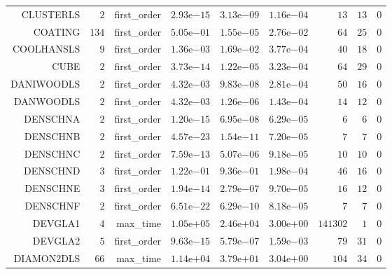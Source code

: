 \begin{longtable}{rrrrrrrrr}
CLUSTERLS & \(     2\) & first\_order & \( 2.93\)e\(-15\) & \( 3.13\)e\(-09\) & \( 1.16\)e\(-04\) & \(    13\) & \(    13\) & \(     0\) \\
COATING & \(   134\) & first\_order & \( 5.05\)e\(-01\) & \( 1.55\)e\(-05\) & \( 2.76\)e\(-02\) & \(    64\) & \(    25\) & \(     0\) \\
COOLHANSLS & \(     9\) & first\_order & \( 1.36\)e\(-03\) & \( 1.69\)e\(-02\) & \( 3.77\)e\(-04\) & \(    40\) & \(    18\) & \(     0\) \\
CUBE & \(     2\) & first\_order & \( 3.73\)e\(-14\) & \( 1.22\)e\(-05\) & \( 3.23\)e\(-04\) & \(    64\) & \(    29\) & \(     0\) \\
DANIWOODLS & \(     2\) & first\_order & \( 4.32\)e\(-03\) & \( 9.83\)e\(-08\) & \( 2.81\)e\(-04\) & \(    50\) & \(    16\) & \(     0\) \\
DANWOODLS & \(     2\) & first\_order & \( 4.32\)e\(-03\) & \( 1.26\)e\(-06\) & \( 1.43\)e\(-04\) & \(    14\) & \(    12\) & \(     0\) \\
DENSCHNA & \(     2\) & first\_order & \( 1.20\)e\(-15\) & \( 6.95\)e\(-08\) & \( 6.29\)e\(-05\) & \(     6\) & \(     6\) & \(     0\) \\
DENSCHNB & \(     2\) & first\_order & \( 4.57\)e\(-23\) & \( 1.54\)e\(-11\) & \( 7.20\)e\(-05\) & \(     7\) & \(     7\) & \(     0\) \\
DENSCHNC & \(     2\) & first\_order & \( 7.59\)e\(-13\) & \( 5.07\)e\(-06\) & \( 9.18\)e\(-05\) & \(    10\) & \(    10\) & \(     0\) \\
DENSCHND & \(     3\) & first\_order & \( 1.22\)e\(-01\) & \( 9.36\)e\(-01\) & \( 1.98\)e\(-04\) & \(    46\) & \(    16\) & \(     0\) \\
DENSCHNE & \(     3\) & first\_order & \( 1.94\)e\(-14\) & \( 2.79\)e\(-07\) & \( 9.70\)e\(-05\) & \(    16\) & \(    12\) & \(     0\) \\
DENSCHNF & \(     2\) & first\_order & \( 6.51\)e\(-22\) & \( 6.29\)e\(-10\) & \( 8.18\)e\(-05\) & \(     7\) & \(     7\) & \(     0\) \\
DEVGLA1 & \(     4\) & max\_time & \( 1.05\)e\(+05\) & \( 2.46\)e\(+04\) & \( 3.00\)e\(+00\) & \(141302\) & \(     1\) & \(     0\) \\
DEVGLA2 & \(     5\) & first\_order & \( 9.63\)e\(-15\) & \( 5.79\)e\(-07\) & \( 1.59\)e\(-03\) & \(    79\) & \(    31\) & \(     0\) \\
DIAMON2DLS & \(    66\) & max\_time & \( 1.14\)e\(+04\) & \( 3.79\)e\(+01\) & \( 3.04\)e\(+00\) & \(   104\) & \(    34\) & \(     0\) \\

\end{longtable}
